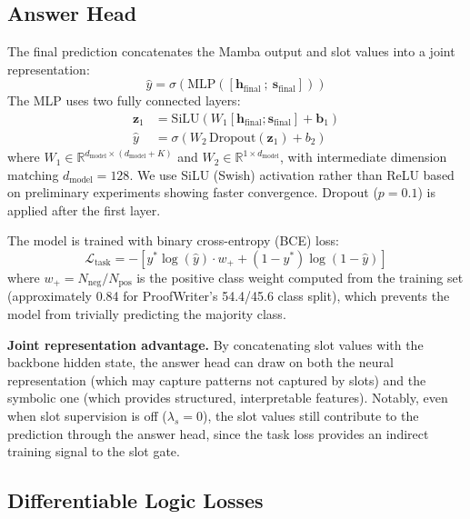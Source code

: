 \documentclass[conference]{IEEEtran}
\newcommand{\Real}{\mathbb{R}}
\begin{document}
\subsection{Answer Head}
\label{sec:answer}

The final prediction concatenates the Mamba output and slot values
into a joint representation:
\begin{equation}
    \hat{y} = \sigma\!\left(\mathrm{MLP}\!\left(
    [\mathbf{h}_\text{final}\ ;\ \mathbf{s}_\text{final}]
    \right)\right)
\end{equation}
The MLP uses two fully connected layers:
\begin{align}
    \mathbf{z}_1 &= \mathrm{SiLU}\!\left(W_1 [\mathbf{h}_{\text{final}}; \mathbf{s}_{\text{final}}] + \mathbf{b}_1\right) \\
    \hat{y} &= \sigma\!\left(W_2\, \mathrm{Dropout}(\mathbf{z}_1) + b_2\right)
\end{align}
where $W_1 \in \Real^{d_{\text{model}} \times (d_{\text{model}} + K)}$
and $W_2 \in \Real^{1 \times d_{\text{model}}}$, with intermediate
dimension matching $d_{\text{model}} = 128$. We use SiLU (Swish)
activation rather than ReLU based on preliminary experiments
showing faster convergence. Dropout ($p=0.1$) is applied after
the first layer.

The model is trained with binary cross-entropy (BCE) loss:
\begin{equation}
    \mathcal{L}_{\text{task}} = -\left[y^* \log(\hat{y}) \cdot w_+ + (1 - y^*) \log(1 - \hat{y})\right]
\end{equation}
where $w_+ = N_{\text{neg}} / N_{\text{pos}}$ is the positive
class weight computed from the training set (approximately 0.84
for ProofWriter's 54.4/45.6 class split), which prevents the
model from trivially predicting the majority class.

\textbf{Joint representation advantage.}
By concatenating slot values with the backbone hidden state, the
answer head can draw on both the neural representation (which may
capture patterns not captured by slots) and the symbolic one
(which provides structured, interpretable features). Notably, even
when slot supervision is off ($\lambda_s = 0$), the slot values
still contribute to the prediction through the answer head, since
the task loss provides an indirect training signal to the slot gate.

\subsection{Differentiable Logic Losses}
\label{sec:logicloss}
\end{document}
